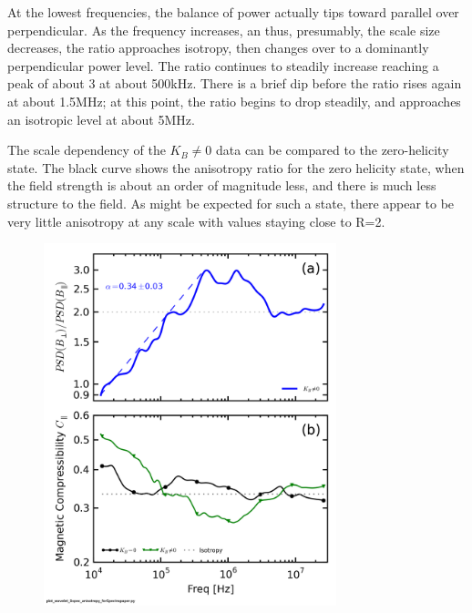 \documentclass[aip,prl,amsmath,amssymb,reprint,superscriptaddress]{revtex4-1} %
\begin{document}
At the lowest frequencies, the balance of power actually tips toward parallel over perpendicular. As the frequency increases, an thus, presumably, the scale size decreases, the ratio approaches isotropy, then changes over to a dominantly perpendicular power level. The ratio continues to steadily increase reaching a peak of about 3 at about 500kHz. There is a brief dip before the ratio rises again at about 1.5MHz; at this point, the ratio begins to drop steadily, and approaches an isotropic level at about 5MHz. 

The scale dependency of the $K_{B}\neq 0$ data can be compared to the zero-helicity state. The black curve shows the anisotropy ratio for the zero helicity state, when the field strength is about an order of magnitude less, and there is much less structure to the field. As might be expected for such a state, there appear to be very little anisotropy at any scale with values staying close to R=2.

\begin{figure}[!htbp]
\centerline{
\includegraphics[width=8.5cm]{mag_compressibility_0helchan1t4prelim_1helchan1t6Kiydef_wratio_wfit}}
\caption{\label{fig:fitratio}}
\end{figure}
\end{document}
